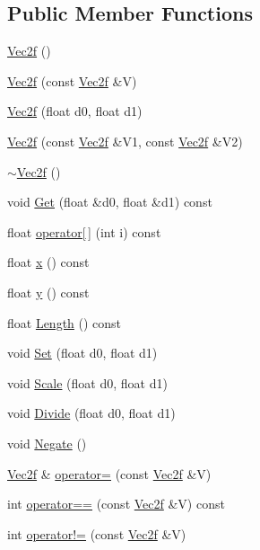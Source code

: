 \subsection*{Public Member Functions}
\begin{DoxyCompactItemize}
\item 
\hyperlink{classVec2f_a3582875fbf3badc6af02646e07bcf440}{Vec2f} ()
\item 
\hyperlink{classVec2f_a1ccd068b35746d18e32a4eace483f6a8}{Vec2f} (const \hyperlink{classVec2f}{Vec2f} \&V)
\item 
\hyperlink{classVec2f_ad05e55e211dd1b8e074f3d7d885702b9}{Vec2f} (float d0, float d1)
\item 
\hyperlink{classVec2f_a3d38f3909d8afebe49d445bce2222f95}{Vec2f} (const \hyperlink{classVec2f}{Vec2f} \&V1, const \hyperlink{classVec2f}{Vec2f} \&V2)
\item 
\hyperlink{classVec2f_a47eb22a462a2c7b7eb61edc07acb94cd}{$\sim$\+Vec2f} ()
\item 
void \hyperlink{classVec2f_a9fae265c16db131c066c14f73612eeeb}{Get} (float \&d0, float \&d1) const 
\item 
float \hyperlink{classVec2f_a289c043da9eeb8b3d2b6431d0e503d7b}{operator\mbox{[}$\,$\mbox{]}} (int i) const 
\item 
float \hyperlink{classVec2f_afa3f111d472b59c28e1d16085672a486}{x} () const 
\item 
float \hyperlink{classVec2f_a95deeb91f6b67910e012afc23e1bee5a}{y} () const 
\item 
float \hyperlink{classVec2f_a4ff073e7f62ee4099033dc000cede267}{Length} () const 
\item 
void \hyperlink{classVec2f_a33fda3509f836bd7edb439dd1704560d}{Set} (float d0, float d1)
\item 
void \hyperlink{classVec2f_a99b9eaccfebc7f10e7931171b1435018}{Scale} (float d0, float d1)
\item 
void \hyperlink{classVec2f_a9e9b6b93359ff9d0dc1208b7ddb37835}{Divide} (float d0, float d1)
\item 
void \hyperlink{classVec2f_a9117c2ca7d92eb0b4cd74916dfd11bf0}{Negate} ()
\item 
\hyperlink{classVec2f}{Vec2f} \& \hyperlink{classVec2f_a09876a9fe3d0e12c16afc31e69d52a95}{operator=} (const \hyperlink{classVec2f}{Vec2f} \&V)
\item 
int \hyperlink{classVec2f_a14005267a1c6a528577ad4d8976a4fd0}{operator==} (const \hyperlink{classVec2f}{Vec2f} \&V) const 
\item 
int \hyperlink{classVec2f_ad35c0e389f6bbcf52b9aabaf0693362f}{operator!=} (const \hyperlink{classVec2f}{Vec2f} \&V)

\end{DoxyCompactItemize}
